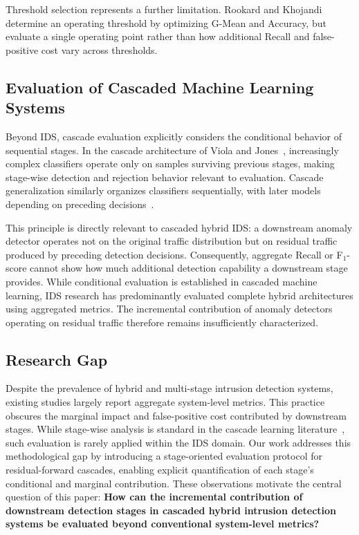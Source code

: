 \documentclass[conference]{IEEEtran}
\begin{document}
Threshold selection represents a further limitation. Rookard and
Khojandi~\cite{rookard2025} determine an operating threshold by
optimizing G-Mean and Accuracy, but evaluate a single operating point
rather than how additional Recall and false-positive cost vary across
thresholds.

\subsection{Evaluation of Cascaded Machine Learning Systems}
\label{subsec:cascaded-ml-eval}

Beyond IDS, cascade evaluation explicitly considers the conditional
behavior of sequential stages. In the cascade architecture of Viola and
Jones~\cite{viola2001rapid}, increasingly complex classifiers operate
only on samples surviving previous stages, making stage-wise detection
and rejection behavior relevant to evaluation. Cascade generalization
similarly organizes classifiers sequentially, with later models
depending on preceding decisions~\cite{gamaCascadeGeneralization2000}.

This principle is directly relevant to cascaded hybrid IDS: a downstream
anomaly detector operates not on the original traffic distribution but
on residual traffic produced by preceding detection decisions.
Consequently, aggregate Recall or F$_1$-score cannot show how much
additional detection capability a downstream stage provides. While
conditional evaluation is established in cascaded machine learning,
IDS research has predominantly evaluated complete hybrid architectures
using aggregated metrics. The incremental contribution of anomaly
detectors operating on residual traffic therefore remains insufficiently
characterized.

\subsection{Research Gap}
\label{subsec:research-gap}

Despite the prevalence of hybrid and multi-stage intrusion detection systems, existing studies largely report aggregate system-level metrics. This practice obscures the marginal impact and false-positive cost contributed by downstream stages. While stage-wise analysis is standard in the cascade learning literature~\cite{viola2001rapid,gamaCascadeGeneralization2000}, such evaluation is rarely applied within the IDS domain. Our work addresses this methodological gap by introducing a stage-oriented evaluation protocol for residual-forward cascades, enabling explicit quantification of each stage’s conditional and marginal contribution.
These observations motivate the central question of this paper: \textbf{How can the incremental contribution of downstream detection stages in cascaded hybrid intrusion detection systems be evaluated beyond conventional system-level metrics?} 
\end{document}
